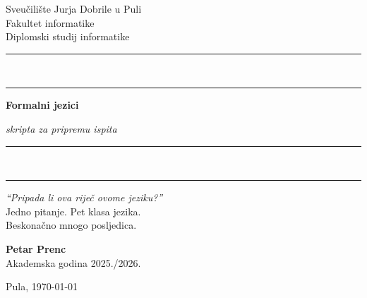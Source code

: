 \documentclass[12pt,a4paper]{report}
\begin{document}
\begin{titlepage}
\thispagestyle{empty}
\centering

\vspace*{0.8cm}

{\sffamily\large Sveučilište Jurja Dobrile u Puli}\\[0.4em]
{\sffamily\normalsize Fakultet informatike}\\[0.4em]
{\sffamily\small Diplomski studij informatike}

\vspace{2.8cm}

{\color{defborder}\rule{0.85\linewidth}{2pt}}\\[3pt]
{\color{defborder}\rule{0.85\linewidth}{0.4pt}}

\vspace{1.2cm}

{\fontsize{46}{52}\selectfont\bfseries\sffamily%
  \color{defborder!75!black} Formalni jezici\par}

\vspace{0.5em}

{\Large\sffamily\itshape skripta za pripremu ispita}

\vspace{1.2cm}

{\color{defborder}\rule{0.85\linewidth}{0.4pt}}\\[3pt]
{\color{defborder}\rule{0.85\linewidth}{2pt}}

\vspace{2.2cm}

\begin{minipage}{0.78\textwidth}
\centering
{\Large\itshape ``Pripada li ova riječ ovome jeziku?''}\\[0.8em]
{\sffamily\normalsize Jedno pitanje. Pet klasa jezika.\\
Beskonačno mnogo posljedica.}
\end{minipage}

\vfill

\begin{tcolorbox}[
  width=0.62\textwidth,
  colback=defbg,
  colframe=defborder,
  arc=5pt,
  boxrule=0.6pt,
  halign=center,
  left=10pt, right=10pt, top=8pt, bottom=8pt
]
{\large\bfseries\sffamily Petar Prenc}\\[0.3em]
{\sffamily\small Akademska godina 2025./2026.}
\end{tcolorbox}

\vspace{0.8cm}

{\sffamily\small Pula, \today}

\vspace{0.5cm}
\end{titlepage}
\end{document}
